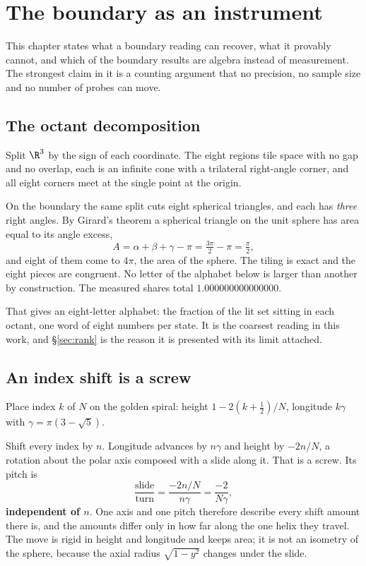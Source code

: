 \chapter{The boundary as an instrument}

This chapter states what a boundary reading can recover, what it provably cannot, and which of the boundary results are algebra instead of measurement. The strongest claim in it is a counting argument that no precision, no sample size and no number of probes can move.

\section{The octant decomposition}

Split \(\R^3\) by the sign of each coordinate. The eight regions tile space with no gap and no overlap, each is an infinite cone with a trilateral right-angle corner, and all eight corners meet at the single point at the origin.

On the boundary the same split cuts eight spherical triangles, and each has \emph{three} right angles. By Girard's theorem a spherical triangle on the unit sphere has area equal to its angle excess,
\[
  A = \alpha + \beta + \gamma - \pi = \tfrac{3\pi}{2} - \pi = \tfrac{\pi}{2},
\]
and eight of them come to \(4\pi\), the area of the sphere. The tiling is exact and the eight pieces are congruent. No letter of the alphabet below is larger than another by construction. The measured shares total \(1.000000000000000\).

That gives an eight-letter alphabet: the fraction of the lit set sitting in each octant, one word of eight numbers per state. It is the coarsest reading in this work, and \S\ref{sec:rank} is the reason it is presented with its limit attached.

\section{An index shift is a screw}

Place index \(k\) of \(N\) on the golden spiral: height \(1 - 2(k + \tfrac12)/N\), longitude \(k\gamma\) with \(\gamma = \pi(3 - \sqrt5)\).

Shift every index by \(n\). Longitude advances by \(n\gamma\) and height by \(-2n/N\), a rotation about the polar axis composed with a slide along it. That is a screw. Its pitch is
\[
  \frac{\text{slide}}{\text{turn}} = \frac{-2n/N}{n\gamma} = \frac{-2}{N\gamma},
\]
\textbf{independent of \(n\)}. One axis and one pitch therefore describe every shift amount there is, and the amounts differ only in how far along the one helix they travel. The move is rigid in height and longitude and keeps area; it is not an isometry of the sphere, because the axial radius \(\sqrt{1 - y^2}\) changes under the slide.

